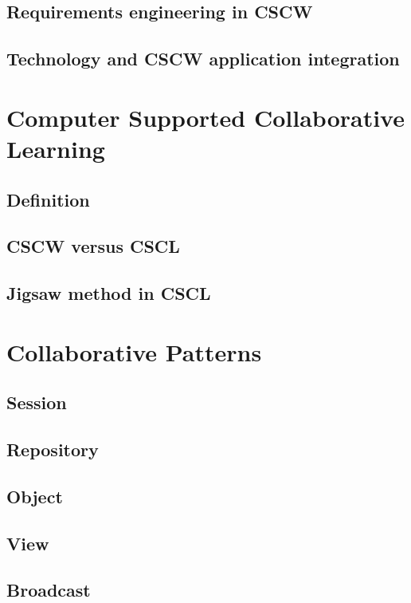 \subsection{Requirements engineering in CSCW}

\subsection{Technology and CSCW application integration}

\section{Computer Supported Collaborative Learning}

\subsection{Definition}

\subsection{CSCW versus CSCL}

\subsection{Jigsaw method in CSCL}

\section{Collaborative Patterns}

\subsection{Session}

\subsection{Repository}

\subsection{Object}

\subsection{View}

\subsection{Broadcast}

